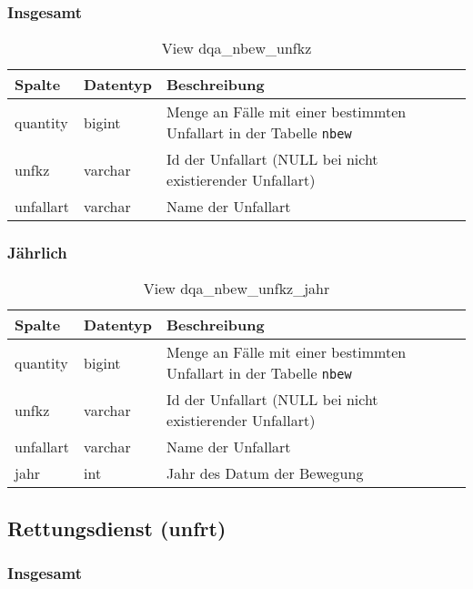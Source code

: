 \subsubsection{Insgesamt} \label{subsubsec:bewUnfkzI}

\begin{table}[ht]
	\centering   
	\caption{View dqa\_nbew\_unfkz}
	\label{tab:bewUnfkzI}
	\begin{tabular}{||l|l|p{10cm}||}   		
		\hline
		Spalte & Datentyp & Beschreibung \\ [0.5ex]
		\hline\hline
		quantity & bigint & Menge an Fälle mit einer bestimmten Unfallart in der Tabelle \texttt{nbew} \\
		\hline
		unfkz & varchar & Id der Unfallart (NULL bei nicht existierender Unfallart)\\
		\hline
		unfallart & varchar & Name der Unfallart \\
		\hline
		
	\end{tabular}
\end{table}

\subsubsection{Jährlich} \label{subsubsec:bewUnfkzJ}

\begin{table}[ht]
	\centering   
	\caption{View dqa\_nbew\_unfkz\_jahr}
	\label{tab:bewUnfkzJ}
	\begin{tabular}{||l|l|p{10cm}||}
		\hline
		Spalte & Datentyp & Beschreibung \\ [0.5ex]
		\hline\hline
		quantity & bigint & Menge an Fälle mit einer bestimmten Unfallart in der Tabelle \texttt{nbew}\\
		\hline
		unfkz & varchar & Id der Unfallart (NULL bei nicht existierender Unfallart)\\
		\hline
		unfallart & varchar & Name der Unfallart \\
		\hline
		jahr & int &  Jahr des Datum der Bewegung \\
		\hline		
	\end{tabular}
\end{table}

\subsection{Rettungsdienst (unfrt)} \label{subsec:bewUnfrt}

\subsubsection{Insgesamt} \label{subsubsec:bewUnfrtI}

